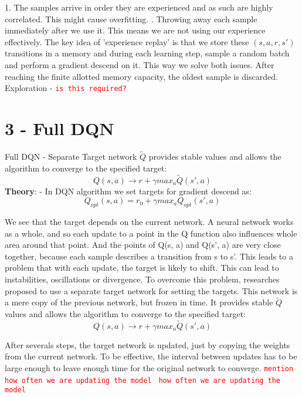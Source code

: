\documentclass[12pt]{article}
\begin{document}
1. The samples arrive in order they are experienced and as such are highly correlated. This might cause overfitting.
. Throwing away each sample immediately after we use it. This means we are not using our experience effectively.
\newline
The key idea of 'experience replay' is that we store these $(s, a, r, s')$ transitions in a memory and during each learning step, sample a random batch and perform a gradient descend on it. This way we solve both issues.
After reaching the finite allotted memory capacity, the oldest sample is discarded.
 Exploration - \textcolor{red}{\texttt{is this required?}}\newline\newline

\section*{3 - Full DQN }
 Full DQN - Separate Target network $\tilde{Q}$ provides stable values and allows the algorithm to converge to the specified target:
\begin{equation}
Q(s,a) \rightarrow r + \gamma max_{a} \tilde{Q}(s', a)
\end{equation}
\textbf{Theory}: - In DQN algorithm we set targets for gradient descend as:
\begin{equation}
Q_{opt}(s,a) = r_{0} + \gamma max_{a}Q_{opt}(s',a)
\end{equation}

We see that the target depends on the current network. A neural network works as a whole, and so each update to a point in the Q function also influences whole area around that point. And the points of Q(s, a) and Q(s’, a) are very close together, because each sample describes a transition from s to s’. This leads to a problem that with each update, the target is likely to shift. This can lead to instabilities, oscillations or divergence.
\newline
To overcome this problem, researches proposed to use a separate target network for setting the targets. This network is a mere copy of the previous network, but frozen in time. It provides stable $\tilde{Q}$ values and allows the algorithm to converge to the specified target:
\begin{equation}
Q(s, a) \xrightarrow{} r + \gamma max_a \tilde{Q}(s', a)
\end{equation}

After severals steps, the target network is updated, just by copying the weights from the current network. To be effective, the interval between updates has to be large enough to leave enough time for the original network to converge.
 \textcolor{red}{\texttt{mention how often we are updating the model}}
\newline
 \textcolor{red}{\texttt{ how often we are updating the model}}
\end{document}
